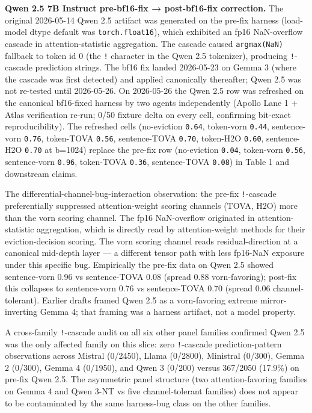\documentclass[
]{article}
\begin{document}
\textbf{Qwen 2.5 7B Instruct pre-bf16-fix → post-bf16-fix correction.}
The original 2026-05-14 Qwen 2.5 artifact was generated on the pre-fix
harness (load-model dtype default was \texttt{torch.float16}), which
exhibited an fp16 NaN-overflow cascade in attention-statistic
aggregation. The cascade caused \texttt{argmax(NaN)} fallback to token
id 0 (the \texttt{!} character in the Qwen 2.5 tokenizer), producing
\texttt{!}-cascade prediction strings. The bf16 fix landed 2026-05-23
on Gemma 3 (where the cascade was first detected) and applied
canonically thereafter; Qwen 2.5 was not re-tested until 2026-05-26.
On 2026-05-26 the Qwen 2.5 row was refreshed on the canonical
bf16-fixed harness by two agents independently (Apollo Lane 1 + Atlas
verification re-run; 0/50 fixture delta on every cell, confirming
bit-exact reproducibility). The refreshed cells (no-eviction
\texttt{0.64}, token-vorn \texttt{0.44}, sentence-vorn \texttt{0.76},
token-TOVA \texttt{0.56}, sentence-TOVA \texttt{0.70}, token-H2O
\texttt{0.60}, sentence-H2O \texttt{0.70} at b=1024) replace the
pre-fix row (no-eviction \texttt{0.04}, token-vorn \texttt{0.56},
sentence-vorn \texttt{0.96}, token-TOVA \texttt{0.36}, sentence-TOVA
\texttt{0.08}) in Table 1 and downstream claims.

The differential-channel-bug-interaction observation: the pre-fix
\texttt{!}-cascade preferentially suppressed attention-weight scoring
channels (TOVA, H2O) more than the vorn scoring channel. The fp16
NaN-overflow originated in attention-statistic aggregation, which is
directly read by attention-weight methods for their eviction-decision
scoring. The vorn scoring channel reads residual-direction at a
canonical mid-depth layer --- a different tensor path with less
fp16-NaN exposure under this specific bug. Empirically the pre-fix
data on Qwen 2.5 showed sentence-vorn 0.96 vs sentence-TOVA 0.08
(spread 0.88 vorn-favoring); post-fix this collapses to sentence-vorn
0.76 vs sentence-TOVA 0.70 (spread 0.06 channel-tolerant). Earlier
drafts framed Qwen 2.5 as a vorn-favoring extreme mirror-inverting
Gemma 4; that framing was a harness artifact, not a model property.

A cross-family \texttt{!}-cascade audit on all six other panel
families confirmed Qwen 2.5 was the only affected family on this
slice: zero \texttt{!}-cascade prediction-pattern observations across
Mistral (0/2450), Llama (0/2800), Ministral (0/300), Gemma 2 (0/300),
Gemma 4 (0/1950), and Qwen 3 (0/200) versus 367/2050 (17.9\%) on
pre-fix Qwen 2.5. The asymmetric panel structure (two attention-favoring families on
Gemma 4 and Qwen 3-NT vs five channel-tolerant families) does not
appear to be contaminated by the same harness-bug class on the other
families.
\end{document}

